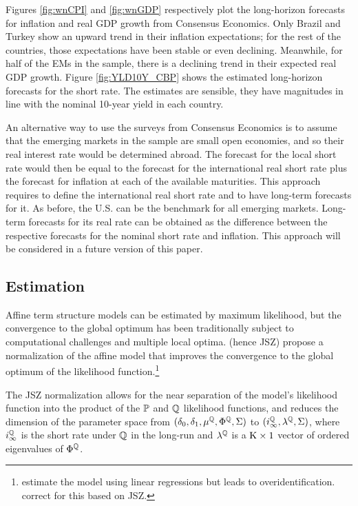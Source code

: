 {Figures \ref{fig:wnCPI} and \ref{fig:wnGDP} respectively plot the long-horizon forecasts for inflation and real GDP growth from Consensus Economics.
Only Brazil and Turkey show an upward trend in their inflation expectations; for the rest of the countries, those expectations have been stable or even declining.
Meanwhile, for half of the EMs in the sample, there is a declining trend in their expected real GDP growth. 
Figure \ref{fig:YLD10Y_CBP} shows the estimated long-horizon forecasts for the short rate. The estimates are sensible, they have magnitudes in line with the nominal 10-year yield in each country.

An alternative way to use the surveys from Consensus Economics is to assume that the emerging markets in the sample are small open economies, and so their real interest rate would be determined abroad. The forecast for the local short rate would then be equal to the forecast for the international real short rate plus the forecast for inflation at each of the available maturities. 
This approach requires to define the international real short rate and to have long-term forecasts for it.
As before, the U.S. can be the benchmark for all emerging markets. Long-term forecasts for its real rate can be obtained as the difference between the respective forecasts for the nominal short rate and inflation.
This approach will be considered in a future version of this paper.


\subsection{Estimation} \label{sec:Estimation}
\iftoggle{toclinks}{\gototoc}{} %
Affine term structure models can be estimated by maximum likelihood, but the convergence to the global optimum has been traditionally subject to computational challenges and multiple local optima.
\citet*{JSZ:2011} (hence JSZ) propose a normalization of the affine model that improves the convergence to the global optimum of the likelihood function.\footnote{ \cite{ACM:2013} estimate the model using linear regressions but leads to overidentification. \cite{GolinskiSpencer:2019} correct for this based on JSZ.} 

The JSZ normalization allows for the near separation of the model's likelihood function into the product of the \(\mathbb{P}\) and \(\mathbb{Q}\) likelihood functions, and reduces the dimension of the parameter space from \((\delta_{0}, \delta_{1}, \mu^{\mathbb{Q}}, \Phi^{\mathbb{Q}}, \Sigma)\) to \((i^{\mathbb{Q}}_{\infty}, \lambda^{\mathbb{Q}},\Sigma)\), where \(i^{\mathbb{Q}}_{\infty}\) is the short rate under \(\mathbb{Q}\) in the long-run and \(\lambda^{\mathbb{Q}}\) is a \(\mathrm{K} \times 1\) vector of ordered eigenvalues of \(\Phi^{\mathbb{Q}}\).

}
